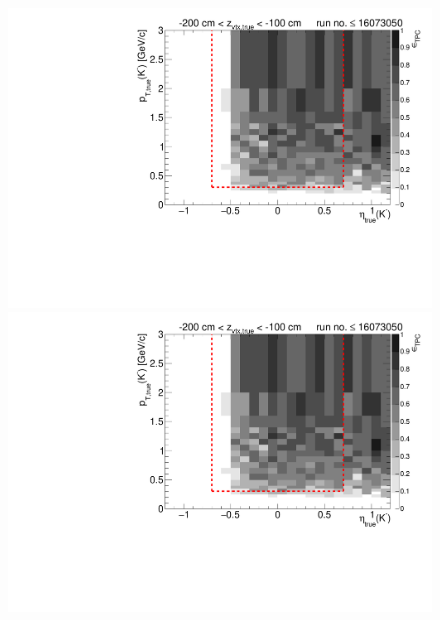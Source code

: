 \begin{figure}[hb]
{  \includegraphics[width=\linewidth,page=16]{graphics/eff/Eff2D_TPC_kaon_Minus_RunRange1.pdf}\\
  \includegraphics[width=\linewidth,page=18]{graphics/eff/Eff2D_TPC_kaon_Minus_RunRange1.pdf}
}%
\end{figure}

